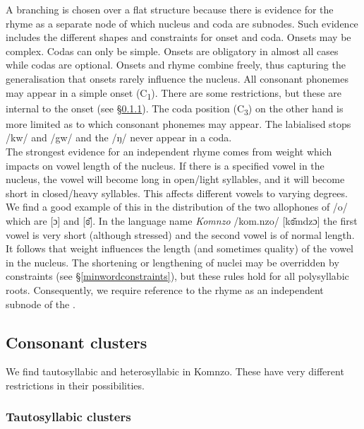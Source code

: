 A branching  is chosen over a flat structure because there is evidence for the rhyme as a separate node of which nucleus and coda are subnodes. Such evidence includes the different shapes and constraints for onset and coda. Onsets may be complex. Codas can only be simple. Onsets are obligatory in almost all cases while codas are optional. Onsets and rhyme combine freely, thus capturing the generalisation that onsets rarely influence the nucleus. All consonant phonemes may appear in a simple onset (C\textsubscript{1}). There are some restrictions, but these are internal to the onset (see \S{}\ref{tautosyllabiccc}). The coda position (C\textsubscript{3}) on the other hand is more limited as to which consonant phonemes may appear. The labialised  stops /kw/ and /gw/ and the   /ŋ/ never appear in a coda.\\

The strongest evidence for an independent rhyme comes from  weight which impacts on vowel length of the nucleus. If there is a specified vowel in the nucleus, the vowel will become long in open/light syllables, and it will become short in closed/heavy syllables. This affects different vowels to varying degrees. We find a good example of this in the distribution of the two allophones of /o/ which are [ɔ] and [ɞ̆]. In the language name \emph{Komnzo} /kom.nzo/ [kɞ̆mdzɔ] the first vowel is very short (although stressed) and the second vowel is of normal length. It follows that  weight influences the length (and sometimes quality) of the vowel in the nucleus. The shortening or lengthening of nuclei may be overridden by  constraints (see \S{}\ref{minwordconstraints}), but these rules hold for all polysyllabic roots. Consequently, we require reference to the rhyme as an independent subnode of the .

\subsection{Consonant clusters} \label{consonantclusters}

We find tautosyllabic and heterosyllabic  in Komnzo. These have very different restrictions in their possibilities.

\subsubsection{Tautosyllabic clusters} \label{tautosyllabiccc}


